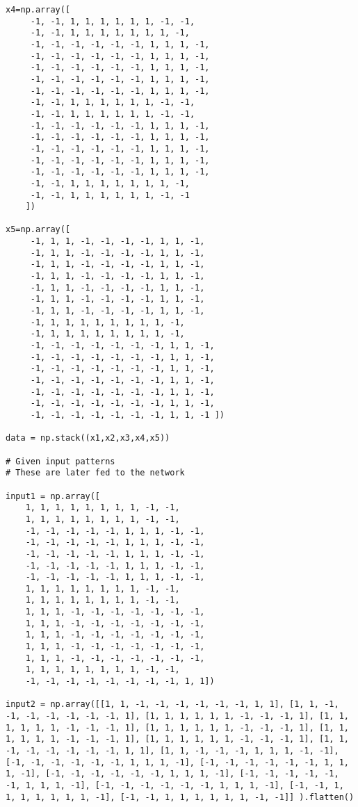 \documentclass{article}
\begin{document}
\begin{verbatim}
x4=np.array([
     -1, -1, 1, 1, 1, 1, 1, 1, -1, -1,
     -1, -1, 1, 1, 1, 1, 1, 1, 1, -1,
     -1, -1, -1, -1, -1, -1, 1, 1, 1, -1,
     -1, -1, -1, -1, -1, -1, 1, 1, 1, -1,
     -1, -1, -1, -1, -1, -1, 1, 1, 1, -1,
     -1, -1, -1, -1, -1, -1, 1, 1, 1, -1,
     -1, -1, -1, -1, -1, -1, 1, 1, 1, -1,
     -1, -1, 1, 1, 1, 1, 1, 1, -1, -1,
     -1, -1, 1, 1, 1, 1, 1, 1, -1, -1,
     -1, -1, -1, -1, -1, -1, 1, 1, 1, -1,
     -1, -1, -1, -1, -1, -1, 1, 1, 1, -1,
     -1, -1, -1, -1, -1, -1, 1, 1, 1, -1,
     -1, -1, -1, -1, -1, -1, 1, 1, 1, -1,
     -1, -1, -1, -1, -1, -1, 1, 1, 1, -1,
     -1, -1, 1, 1, 1, 1, 1, 1, 1, -1,
     -1, -1, 1, 1, 1, 1, 1, 1, -1, -1
    ])

x5=np.array([
     -1, 1, 1, -1, -1, -1, -1, 1, 1, -1,
     -1, 1, 1, -1, -1, -1, -1, 1, 1, -1,
     -1, 1, 1, -1, -1, -1, -1, 1, 1, -1,
     -1, 1, 1, -1, -1, -1, -1, 1, 1, -1,
     -1, 1, 1, -1, -1, -1, -1, 1, 1, -1,
     -1, 1, 1, -1, -1, -1, -1, 1, 1, -1,
     -1, 1, 1, -1, -1, -1, -1, 1, 1, -1,
     -1, 1, 1, 1, 1, 1, 1, 1, 1, -1,
     -1, 1, 1, 1, 1, 1, 1, 1, 1, -1,
     -1, -1, -1, -1, -1, -1, -1, 1, 1, -1,
     -1, -1, -1, -1, -1, -1, -1, 1, 1, -1,
     -1, -1, -1, -1, -1, -1, -1, 1, 1, -1,
     -1, -1, -1, -1, -1, -1, -1, 1, 1, -1,
     -1, -1, -1, -1, -1, -1, -1, 1, 1, -1,
     -1, -1, -1, -1, -1, -1, -1, 1, 1, -1,
     -1, -1, -1, -1, -1, -1, -1, 1, 1, -1 ])

data = np.stack((x1,x2,x3,x4,x5))

# Given input patterns
# These are later fed to the network

input1 = np.array([
    1, 1, 1, 1, 1, 1, 1, 1, -1, -1, 
    1, 1, 1, 1, 1, 1, 1, 1, -1, -1, 
    -1, -1, -1, -1, -1, 1, 1, 1, -1, -1, 
    -1, -1, -1, -1, -1, 1, 1, 1, -1, -1, 
    -1, -1, -1, -1, -1, 1, 1, 1, -1, -1, 
    -1, -1, -1, -1, -1, 1, 1, 1, -1, -1, 
    -1, -1, -1, -1, -1, 1, 1, 1, -1, -1, 
    1, 1, 1, 1, 1, 1, 1, 1, -1, -1, 
    1, 1, 1, 1, 1, 1, 1, 1, -1, -1, 
    1, 1, 1, -1, -1, -1, -1, -1, -1, -1, 
    1, 1, 1, -1, -1, -1, -1, -1, -1, -1, 
    1, 1, 1, -1, -1, -1, -1, -1, -1, -1, 
    1, 1, 1, -1, -1, -1, -1, -1, -1, -1, 
    1, 1, 1, -1, -1, -1, -1, -1, -1, -1, 
    1, 1, 1, 1, 1, 1, 1, 1, -1, -1, 
    -1, -1, -1, -1, -1, -1, -1, -1, 1, 1]) 

input2 = np.array([[1, 1, -1, -1, -1, -1, -1, -1, 1, 1], [1, 1, -1, -1, -1, -1, -1, -1, -1, 1], [1, 1, 1, 1, 1, 1, -1, -1, -1, 1], [1, 1, 1, 1, 1, 1, -1, -1, -1, 1], [1, 1, 1, 1, 1, 1, -1, -1, -1, 1], [1, 1, 1, 1, 1, 1, -1, -1, -1, 1], [1, 1, 1, 1, 1, 1, -1, -1, -1, 1], [1, 1, -1, -1, -1, -1, -1, -1, 1, 1], [1, 1, -1, -1, -1, 1, 1, 1, -1, -1], [-1, -1, -1, -1, -1, -1, 1, 1, 1, -1], [-1, -1, -1, -1, -1, -1, 1, 1, 1, -1], [-1, -1, -1, -1, -1, -1, 1, 1, 1, -1], [-1, -1, -1, -1, -1, -1, 1, 1, 1, -1], [-1, -1, -1, -1, -1, -1, 1, 1, 1, -1], [-1, -1, 1, 1, 1, 1, 1, 1, 1, -1], [-1, -1, 1, 1, 1, 1, 1, 1, -1, -1]] ).flatten()


\end{verbatim}
\end{document}
